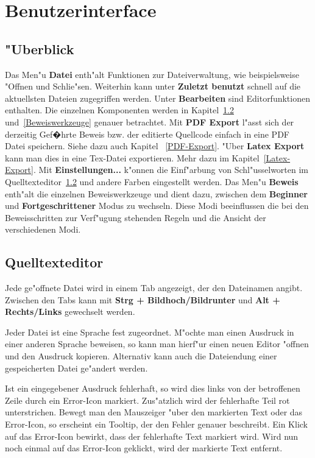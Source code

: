 
\chapter{Benutzerinterface}

\section{"Uberblick} 

Das Men"u {\bf Datei} enth"alt Funktionen zur Dateiverwaltung, wie
beispielsweise "Offnen und Schlie"sen. Weiterhin kann unter {\bf
Zuletzt benutzt} schnell auf die aktuellsten Dateien zugegriffen
werden. Unter {\bf Bearbeiten} sind Editorfunktionen enthalten. Die
einzelnen Komponenten werden in Kapitel~\ref{Qelltexteditor}
und~\ref{Beweiswerkzeuge} genauer betrachtet. Mit {\bf PDF Export} l"asst 
sich der derzeitig Gef�hrte Beweis bzw. der editierte Quellcode einfach
in eine PDF Datei speichern. Siehe dazu auch Kapitel ~\ref{PDF-Export}. "Uber {\bf Latex Export}
kann man dies in eine Tex-Datei
exportieren. Mehr dazu im Kapitel~\ref{Latex-Export}. Mit {\bf
Einstellungen...} k"onnen die
Einf"arbung von Schl"usselworten im
Quelltexteditor~\ref{Qelltexteditor} und andere Farben eingestellt werden. Das Men"u {\bf Beweis}
enth"alt die einzelnen Beweiswerkzeuge und dient dazu, zwischen dem
{\bf Beginner} und {\bf Fortgeschrittener} Modus zu wechseln. Diese
Modi beeinflussen die bei den Beweisschritten zur Verf"ugung
stehenden Regeln und die Ansicht der verschiedenen Modi. 

\section {Quelltexteditor}
\label{Qelltexteditor} Jede ge"offnete Datei wird in einem Tab
angezeigt, der den Dateinamen angibt. Zwischen den Tabs kann mit
{\bf Strg + Bildhoch/Bildrunter} und {\bf Alt + Rechts/Links}
gewechselt werden.

Jeder Datei ist eine Sprache fest zugeordnet. M"ochte man einen
Ausdruck in einer anderen Sprache beweisen, so kann man hierf"ur
einen neuen Editor "offnen und den Ausdruck kopieren. Alternativ
kann auch die Dateiendung einer gespeicherten Datei ge"andert
werden. 

Ist ein eingegebener Ausdruck fehlerhaft, so wird dies links
von der betroffenen Zeile durch ein Error-Icon markiert. Zus"atzlich 
wird der fehlerhafte Teil rot unterstrichen. Bewegt man den Mauszeiger 
"uber den markierten Text oder das Error-Icon,
so erscheint ein Tooltip, der den Fehler genauer beschreibt. Ein Klick
auf das Error-Icon bewirkt, dass der fehlerhafte Text markiert wird. Wird
nun noch einmal auf das Error-Icon geklickt, wird der markierte Text
entfernt.

